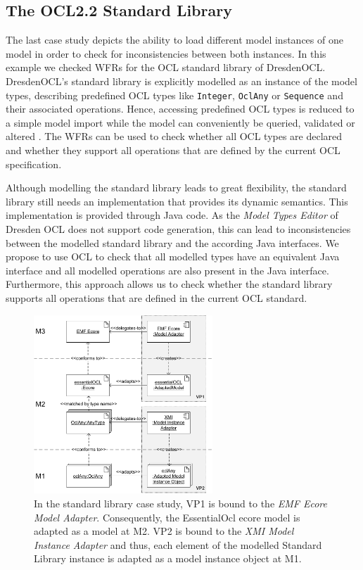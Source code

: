 \subsection{The OCL2.2 Standard Library}
The last case study depicts the ability to load different model instances of one model 
in order to check for inconsistencies between both instances. In this example we 
checked WFRs for the OCL standard library of DresdenOCL. 
DresdenOCL's standard library is explicitly modelled as 
an instance of the model types, describing predefined OCL types like \texttt{Integer}, 
\texttt{OclAny} or \texttt{Sequence} and their associated operations. 
Hence, accessing predefined OCL types is reduced to a simple model 
import while the model can conveniently be queried, validated or altered 
\cite{braeuerOCL07}. The WFRs can be used to check whether all OCL types are 
declared and whether they support all operations that are defined by the 
current OCL specification.

Although modelling the standard library leads to great flexibility, the standard library 
still needs an implementation that provides its dynamic semantics. 
This implementation is provided through Java code. As the \textit{Model Types Editor} of Dresden OCL
does not support code generation, this can lead to inconsistencies between 
the modelled standard library and the according Java interfaces.
We propose to use OCL to check that all modelled types have an equivalent Java 
interface and all modelled operations are also present in the Java interface. Furthermore, 
this approach allows us to check whether the standard library supports all operations that 
are defined in the current OCL standard.

\begin{figure}[!t]
	\centering
		\includegraphics[width=0.60\textwidth]{figures/casestudy03.pdf}
	\caption{In the standard library case study, VP1 is bound to the \textit{EMF Ecore Model Adapter}. 
	  Consequently, the EssentialOcl ecore model is adapted as a model at M2.
	  VP2 is bound to the \textit{XMI Model Instance Adapter} and thus, each element of the modelled Standard Library
	  instance is adapted as a model instance object at M1.}
	\label{fig:casestudy03}
\end{figure}

